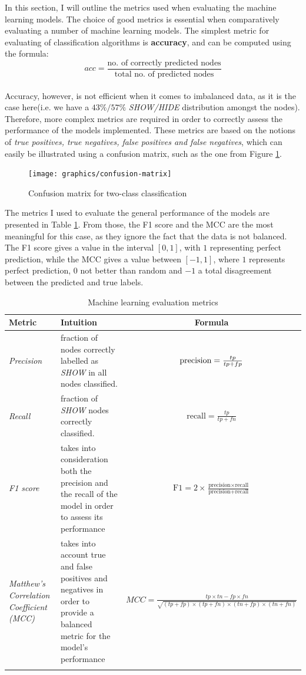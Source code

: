 		In this section, I will outline the metrics used when evaluating the machine learning models. The choice of good metrics is essential when comparatively evaluating a number of machine learning models. The simplest metric for evaluating of classification algorithms is \textbf{accuracy}, and can be computed using the formula: 
		\\
		\begin{equation}
			acc = \frac{\text{no. of correctly predicted nodes}}{\text{total no. of predicted nodes}}
		\end{equation}
		\\
		Accuracy, however, is not efficient when it comes to imbalanced data, as it is the case here(i.e. we have a $43\%/57\%$ \textit{SHOW/HIDE} distribution amongst the nodes). Therefore, more complex metrics are required in order to correctly assess the performance of the models implemented. These metrics are based on the notions of \textit{true positives, true negatives, false positives and false negatives}, which can easily be illustrated using a confusion matrix, such as the one from Figure \ref{Fig: eval/ml/metrics/confusion-matrix}.
		\begin{figure}[H]
			\centering
			\texttt{[image: graphics/confusion-matrix]}
			\caption{Confusion matrix for two-class classification}
			\label{Fig: eval/ml/metrics/confusion-matrix}
		\end{figure}
		The metrics I used to evaluate the general performance of the models are presented in Table \ref{Table: eval/ml/metrics/metrics}. From those, the F1 score and the MCC are the most meaningful for this case, as they ignore the fact that the data is not balanced. The F1 score gives a value in the interval $[0, 1]$, with $1$ representing perfect prediction, while the MCC gives a value between $[-1, 1]$, where $1$ represents perfect prediction, $0$ not better than random and $-1$ a total disagreement between the predicted and true labels.
		\begin{longtable}{|p{}|p{}|c|}
		   \textbf{Metric} & \textbf{Intuition} &\textbf{Formula} \\
			\hline
			\textit{Precision} & fraction of nodes correctly labelled as \textit{SHOW} in all nodes classified. & {$\centering \text{precision} = \frac{tp}{tp+fp}$} \\
			\hline 
			\textit{Recall} & fraction of \textit{SHOW} nodes correctly classified. & $\text{recall} = \frac{tp}{tp+fn}$ \\
			\hline
			\textit{F1 score} & takes into consideration both the precision and the recall of the model in order to assess its performance & $\text{F1} = 2\times\frac{\text{precision}\times\text{recall}}{\text{precision} + \text{recall}}$\\
			\hline 
			\textit{Matthew's Correlation Coefficient (MCC)} & takes into account true and false positives and negatives in order to provide a balanced metric for the model's performance & $MCC = \frac{tp\times tn - fp\times fn}{\sqrt{(tp+fp)\times(tp+fn)\times(tn+fp)\times(tn+fn)}}$\\
			\hline
			\caption{Machine learning evaluation metrics}
			\label{Table: eval/ml/metrics/metrics}
		\end{longtable}
		

